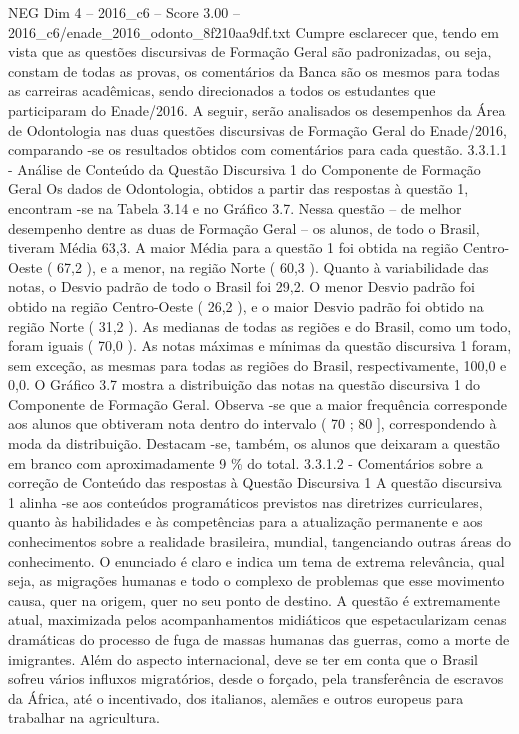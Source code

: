 \begin{textsample}{NEG Dim 4 – 2016\_c6 – Score 3.00 – 2016\_c6/enade\_2016\_odonto\_8f210aa9df.txt}
Cumpre esclarecer que, tendo em vista que as questões discursivas de Formação Geral são padronizadas, ou seja, constam de todas as provas, os comentários da Banca são os mesmos para todas as carreiras acadêmicas, sendo direcionados a todos os estudantes que participaram do Enade/2016.
A seguir, serão analisados os desempenhos da Área de Odontologia nas duas questões discursivas de Formação Geral do Enade/2016, comparando -se os resultados obtidos com comentários para cada questão. 3.3.1.1 - Análise de Conteúdo da Questão Discursiva 1 do Componente de Formação Geral Os dados de Odontologia, obtidos a partir das respostas à questão 1, encontram -se na Tabela 3.14 e no Gráfico 3.7.
Nessa questão – de melhor desempenho dentre as duas de Formação Geral – os alunos, de todo o Brasil, tiveram Média 63,3.
A maior Média para a questão 1 foi obtida na região Centro-Oeste ( 67,2 ), e a menor, na região Norte ( 60,3 ).
Quanto à variabilidade das notas, o Desvio padrão de todo o Brasil foi 29,2.
O menor Desvio padrão foi obtido na região Centro-Oeste ( 26,2 ), e o maior Desvio padrão foi obtido na região Norte ( 31,2 ).
As medianas de todas as regiões e do Brasil, como um todo, foram iguais ( 70,0 ).
As notas máximas e mínimas da questão discursiva 1 foram, sem exceção, as mesmas para todas as regiões do Brasil, respectivamente, 100,0 e 0,0.
O Gráfico 3.7 mostra a distribuição das notas na questão discursiva 1 do Componente de Formação Geral.
Observa -se que a maior frequência corresponde aos alunos que obtiveram nota dentro do intervalo ( 70 ; 80 ], correspondendo à moda da distribuição.
Destacam -se, também, os alunos que deixaram a questão em branco com aproximadamente 9 \% do total. 3.3.1.2 - Comentários sobre a correção de Conteúdo das respostas à Questão Discursiva 1 A questão discursiva 1 alinha -se aos conteúdos programáticos previstos nas diretrizes curriculares, quanto às habilidades e às competências para a atualização permanente e aos conhecimentos sobre a realidade brasileira, mundial, tangenciando outras áreas do conhecimento.
O enunciado é claro e indica um tema de extrema relevância, qual seja, as migrações humanas e todo o complexo de problemas que esse movimento causa, quer na origem, quer no seu ponto de destino.
A questão é extremamente atual, maximizada pelos acompanhamentos midiáticos que espetacularizam cenas dramáticas do processo de fuga de massas humanas das guerras, como a morte de imigrantes.
Além do aspecto internacional, deve se ter em conta que o Brasil sofreu vários influxos migratórios, desde o forçado, pela transferência de escravos da África, até o incentivado, dos italianos, alemães e outros europeus para trabalhar na agricultura.

\end{textsample}

